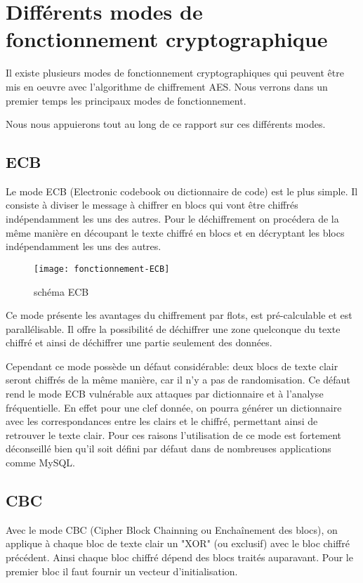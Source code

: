\chapter{Différents modes de fonctionnement cryptographique}
\label{chap:différents modes}

Il existe plusieurs modes de fonctionnement cryptographiques qui peuvent être mis en oeuvre avec l'algorithme de chiffrement AES. Nous verrons dans un premier temps les principaux modes de fonctionnement.

Nous nous appuierons tout au long de ce rapport sur ces différents modes.

\section{ECB}

Le mode ECB (Electronic codebook ou dictionnaire de code) est le plus simple. Il consiste à diviser le message à chiffrer en blocs qui vont être chiffrés indépendamment les uns des autres. Pour le déchiffrement on procédera de la même manière en découpant le texte chiffré en blocs et en décryptant les blocs indépendamment les uns des autres.

\begin{figure}[!h]
  \centering
  \texttt{[image: fonctionnement-ECB]}
  \caption{schéma ECB \cite{wiki}}
  \label{schema ECB}
\end{figure}

Ce mode présente les avantages du chiffrement par flots, est pré-calculable et est parallélisable. Il offre la possibilité de déchiffrer une zone quelconque du texte chiffré et ainsi de déchiffrer une partie seulement des données.

Cependant ce mode possède un défaut considérable: deux blocs de texte clair seront chiffrés de la même manière, car il n'y a pas de randomisation. Ce défaut rend le mode ECB vulnérable aux attaques par dictionnaire et à l'analyse fréquentielle. En effet pour une clef donnée, on pourra générer un dictionnaire avec les correspondances entre les clairs et le chiffré, permettant ainsi de retrouver le texte clair. Pour ces raisons l'utilisation de ce mode est fortement déconseillé bien qu'il soit défini par défaut dans de nombreuses applications comme MySQL.

\section{CBC}
\label{cbc}
Avec le mode CBC (Cipher Block Chainning ou Enchaînement des blocs), on applique à chaque bloc de texte clair un "XOR" (ou exclusif) avec le bloc chiffré précédent. Ainsi chaque bloc chiffré dépend des blocs traités auparavant. Pour le premier bloc il faut fournir un vecteur d'initialisation.

